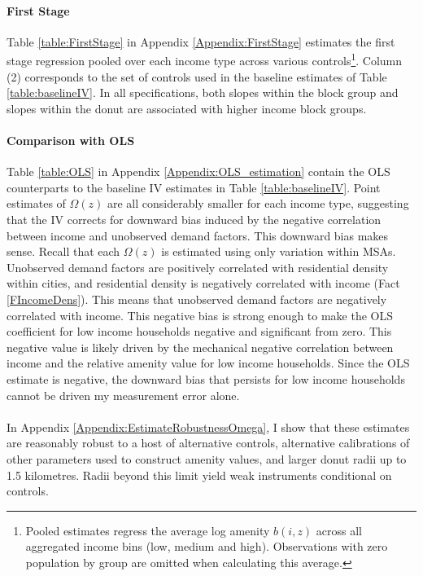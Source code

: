 \documentclass[12pt]{article}
\begin{document}
\paragraph*{First Stage} Table \ref{table:FirstStage} in Appendix \ref{Appendix:FirstStage} estimates the first stage regression pooled over each income type across various controls\footnote{Pooled estimates regress the average log amenity $b(i, z)$ across all aggregated income bins (low, medium and high). Observations with zero population by group are omitted when calculating this average.}. Column (2) corresponds to the set of controls used in the baseline estimates of Table \ref{table:baselineIV}. In all specifications, both slopes within the block group and slopes within the donut are associated with higher income block groups.

\paragraph*{Comparison with OLS} Table \ref{table:OLS} in Appendix \ref{Appendix:OLS_estimation} contain the OLS counterparts to the baseline IV estimates in Table \ref{table:baselineIV}. Point estimates of $\Omega(z)$ are all considerably smaller for each income type, suggesting that the IV corrects for downward bias induced by the negative correlation between income and unobserved demand factors. This downward bias makes sense. Recall that each $\Omega(z)$ is estimated using only variation within MSAs. Unobserved demand factors are positively correlated with residential density within cities, and residential density is negatively correlated with income (Fact \ref{FIncomeDens}). This means that unobserved demand factors are negatively correlated with income. This negative bias is strong enough to make the OLS coefficient for low income households negative and significant from zero. This negative value is likely driven by the mechanical negative correlation between income and the relative amenity value for low income households. Since the OLS estimate is negative, the downward bias that persists for low income households cannot be driven my measurement error alone.

\paragraph*{}
In Appendix \ref{Appendix:EstimateRobustnessOmega}, I show that these estimates are reasonably robust to a host of alternative controls, alternative calibrations of other parameters used to construct amenity values, and larger donut radii up to 1.5 kilometres. Radii beyond this limit yield weak instruments conditional on controls. 
\end{document}
